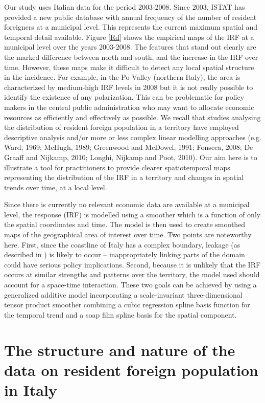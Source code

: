 Our study uses Italian data for the period 2003-2008. Since 2003, ISTAT has provided a new public database with annual frequency of the number of resident foreigners at a municipal level. This represents the current maximum spatial and temporal detail available. Figure \ref{Rd} shows the empirical maps of the IRF at a municipal level over the years 2003-2008. The features that stand out clearly are the marked difference between north and south, and the increase in the IRF over time. However, these maps make it difficult to detect any local spatial structure in the incidence. For example, in the Po Valley (northern Italy), the area is characterized by medium-high IRF levels in 2008 but it is not really possible to identify the existence of any polarization. This can be problematic for policy makers in the central public administration who may want to allocate economic resources as efficiently and effectively as possible. We recall that studies analysing the distribution of resident foreign population in a territory have employed descriptive analysis and/or more or less complex linear modelling approaches (e.g. Ward, 1969; McHugh, 1989; Greenwood and McDowel, 1991; Fonseca, 2008; De Graaff and Nijkamp, 2010; Longhi, Nijkamp and Poot, 2010). Our aim here is to illustrate a tool for practitioners to provide clearer spatiotemporal maps representing the distribution of the IRF in a territory and changes in spatial trends over time, at a local level. 

Since there is currently no relevant economic data are available at a municipal level, the response (IRF) is modelled using a smoother which is a function of only the spatial coordinates and time. The model is then used to create smoothed maps of the geographical area of interest over time. Two points are noteworthy here. First, since the coastline of Italy has a complex boundary, leakage (as described in ) is likely to occur -- inappropriately linking parts of the domain could have serious policy implications. Second, because it is unlikely that the IRF occurs at similar strengths and patterns over the territory, the model used should account for a space-time interaction. These two goals can be achieved by using a generalized additive model incorporating a scale-invariant three-dimensional tensor product smoother combining a cubic regression spline basis function for the temporal trend and a soap film spline basis for the spatial component.


\section{The structure and nature of the data on resident foreign population in Italy\label{SDC}}

